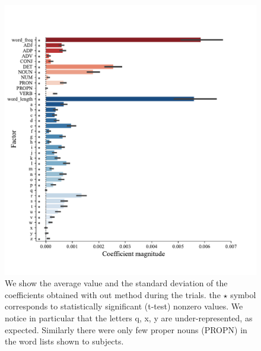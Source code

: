 \documentclass{article}
\begin{document}
\begin{figure}[h]
  \centering
  \includegraphics[width=\textwidth, trim=0cm 0cm 0cm 0cm]{figures/pvalues_vertical.pdf}
  \caption{We show the average value and the standard deviation of the coefficients obtained with out method during the trials. the $\star$  symbol corresponds to statistically significant (t-test) nonzero values. We notice in particular that the letters q, x, y are under-represented, as expected. Similarly there were only few proper nouns (PROPN) in the word lists shown to subjects. }
  \label{fig:ridgebaselineresult}
\end{figure}
\end{document}
